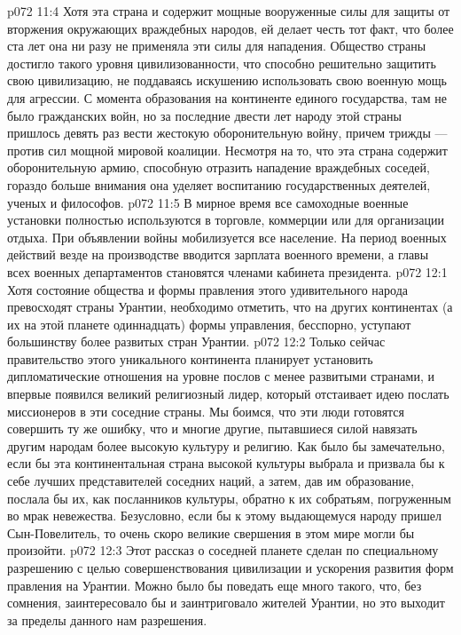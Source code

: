 \vs p072 11:4 \pc Хотя эта страна и содержит мощные вооруженные силы для защиты от вторжения окружающих враждебных народов, ей делает честь тот факт, что более ста лет она ни разу не применяла эти силы для нападения. Общество страны достигло такого уровня цивилизованности, что способно решительно защитить свою цивилизацию, не поддаваясь искушению использовать свою военную мощь для агрессии. С момента образования на континенте единого государства, там не было гражданских войн, но за последние двести лет народу этой страны пришлось девять раз вести жестокую оборонительную войну, причем трижды --- против сил мощной мировой коалиции. Несмотря на то, что эта страна содержит оборонительную армию, способную отразить нападение враждебных соседей, гораздо больше внимания она уделяет воспитанию государственных деятелей, ученых и философов.
\vs p072 11:5 В мирное время все самоходные военные установки полностью используются в торговле, коммерции или для организации отдыха. При объявлении войны мобилизуется все население. На период военных действий везде на производстве вводится зарплата военного времени, а главы всех военных департаментов становятся членами кабинета президента.
\vs p072 12:1 Хотя состояние общества и формы правления этого удивительного народа превосходят страны Урантии, необходимо отметить, что на других континентах (а их на этой планете одиннадцать) формы управления, бесспорно, уступают большинству более развитых стран Урантии.
\vs p072 12:2 Только сейчас правительство этого уникального континента планирует установить дипломатические отношения на уровне послов с менее развитыми странами, и впервые появился великий религиозный лидер, который отстаивает идею послать миссионеров в эти соседние страны. Мы боимся, что эти люди готовятся совершить ту же ошибку, что и многие другие, пытавшиеся силой навязать другим народам более высокую культуру и религию. Как было бы замечательно, если бы эта континентальная страна высокой культуры выбрала и призвала бы к себе лучших представителей соседних наций, а затем, дав им образование, послала бы их, как посланников культуры, обратно к их собратьям, погруженным во мрак невежества. Безусловно, если бы к этому выдающемуся народу пришел Сын\hyp{}Повелитель, то очень скоро великие свершения в этом мире могли бы произойти.
\vs p072 12:3 \pc Этот рассказ о соседней планете сделан по специальному разрешению с целью совершенствования цивилизации и ускорения развития форм правления на Урантии. Можно было бы поведать еще много такого, что, без сомнения, заинтересовало бы и заинтриговало жителей Урантии, но это выходит за пределы данного нам разрешения.

